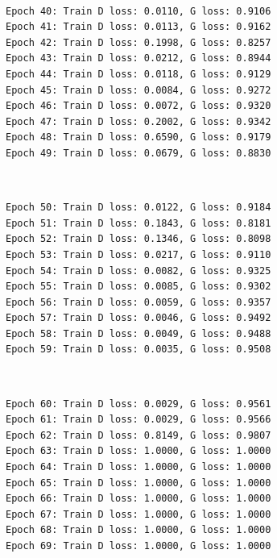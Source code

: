 \documentclass[11pt]{article}
\begin{document}
    \begin{center}
    \end{center}
    { \hspace*{\fill} \\}
    
    \begin{Verbatim}[commandchars=\\\{\}]
Epoch 40: Train D loss: 0.0110, G loss: 0.9106
Epoch 41: Train D loss: 0.0113, G loss: 0.9162
Epoch 42: Train D loss: 0.1998, G loss: 0.8257
Epoch 43: Train D loss: 0.0212, G loss: 0.8944
Epoch 44: Train D loss: 0.0118, G loss: 0.9129
Epoch 45: Train D loss: 0.0084, G loss: 0.9272
Epoch 46: Train D loss: 0.0072, G loss: 0.9320
Epoch 47: Train D loss: 0.2002, G loss: 0.9342
Epoch 48: Train D loss: 0.6590, G loss: 0.9179
Epoch 49: Train D loss: 0.0679, G loss: 0.8830

    \end{Verbatim}

    \begin{center}
    \end{center}
    { \hspace*{\fill} \\}
    
    \begin{Verbatim}[commandchars=\\\{\}]
Epoch 50: Train D loss: 0.0122, G loss: 0.9184
Epoch 51: Train D loss: 0.1843, G loss: 0.8181
Epoch 52: Train D loss: 0.1346, G loss: 0.8098
Epoch 53: Train D loss: 0.0217, G loss: 0.9110
Epoch 54: Train D loss: 0.0082, G loss: 0.9325
Epoch 55: Train D loss: 0.0085, G loss: 0.9302
Epoch 56: Train D loss: 0.0059, G loss: 0.9357
Epoch 57: Train D loss: 0.0046, G loss: 0.9492
Epoch 58: Train D loss: 0.0049, G loss: 0.9488
Epoch 59: Train D loss: 0.0035, G loss: 0.9508

    \end{Verbatim}

    \begin{center}
    \end{center}
    { \hspace*{\fill} \\}
    
    \begin{Verbatim}[commandchars=\\\{\}]
Epoch 60: Train D loss: 0.0029, G loss: 0.9561
Epoch 61: Train D loss: 0.0029, G loss: 0.9566
Epoch 62: Train D loss: 0.8149, G loss: 0.9807
Epoch 63: Train D loss: 1.0000, G loss: 1.0000
Epoch 64: Train D loss: 1.0000, G loss: 1.0000
Epoch 65: Train D loss: 1.0000, G loss: 1.0000
Epoch 66: Train D loss: 1.0000, G loss: 1.0000
Epoch 67: Train D loss: 1.0000, G loss: 1.0000
Epoch 68: Train D loss: 1.0000, G loss: 1.0000
Epoch 69: Train D loss: 1.0000, G loss: 1.0000

    \end{Verbatim}
\end{document}
